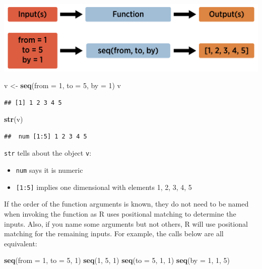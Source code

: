 \documentclass[
]{book}
\newenvironment{Shaded}{\begin{snugshade}}{\end{snugshade}}
\newcommand{\DataTypeTok}[1]{\textcolor[rgb]{0.13,0.29,0.53}{#1}}
\newcommand{\DecValTok}[1]{\textcolor[rgb]{0.00,0.00,0.81}{#1}}
\newcommand{\KeywordTok}[1]{\textcolor[rgb]{0.13,0.29,0.53}{\textbf{#1}}}
\newcommand{\NormalTok}[1]{#1}
\newcommand{\StringTok}[1]{\textcolor[rgb]{0.31,0.60,0.02}{#1}}
\theoremstyle{definition}
\theoremstyle{definition}
\theoremstyle{definition}
\theoremstyle{remark}
\begin{document}
\begin{center}\includegraphics[width=0.8\linewidth]{img/funVisual2F} \end{center}

\begin{Shaded}
\begin{Highlighting}[]
\NormalTok{v <-}\StringTok{ }\KeywordTok{seq}\NormalTok{(}\DataTypeTok{from =} \DecValTok{1}\NormalTok{, }\DataTypeTok{to =} \DecValTok{5}\NormalTok{, }\DataTypeTok{by =} \DecValTok{1}\NormalTok{)}
\NormalTok{v}
\end{Highlighting}
\end{Shaded}

\begin{verbatim}
## [1] 1 2 3 4 5
\end{verbatim}

\begin{Shaded}
\begin{Highlighting}[]
\KeywordTok{str}\NormalTok{(v)}
\end{Highlighting}
\end{Shaded}

\begin{verbatim}
##  num [1:5] 1 2 3 4 5
\end{verbatim}

\texttt{str} tells about the object \texttt{v}:

\begin{itemize}
\item
  \texttt{num} says it is numeric
\item
  \texttt{{[}1:5{]}} implies one dimensional with elements 1, 2, 3, 4, 5
\end{itemize}

If the order of the function arguments is known, they do not need to be named when invoking the function as R uses positional matching to determine the inputs. Also, if you name some arguments but not others, R will use positional matching for the remaining inputs. For example, the calls below are all equivalent:

\begin{Shaded}
\begin{Highlighting}[]
\KeywordTok{seq}\NormalTok{(}\DataTypeTok{from =} \DecValTok{1}\NormalTok{, }\DataTypeTok{to =} \DecValTok{5}\NormalTok{, }\DecValTok{1}\NormalTok{)}
\KeywordTok{seq}\NormalTok{(}\DecValTok{1}\NormalTok{, }\DecValTok{5}\NormalTok{, }\DecValTok{1}\NormalTok{)}
\KeywordTok{seq}\NormalTok{(}\DataTypeTok{to =} \DecValTok{5}\NormalTok{, }\DecValTok{1}\NormalTok{, }\DecValTok{1}\NormalTok{)}
\KeywordTok{seq}\NormalTok{(}\DataTypeTok{by =} \DecValTok{1}\NormalTok{, }\DecValTok{1}\NormalTok{, }\DecValTok{5}\NormalTok{)}
\end{Highlighting}
\end{Shaded}
\end{document}
